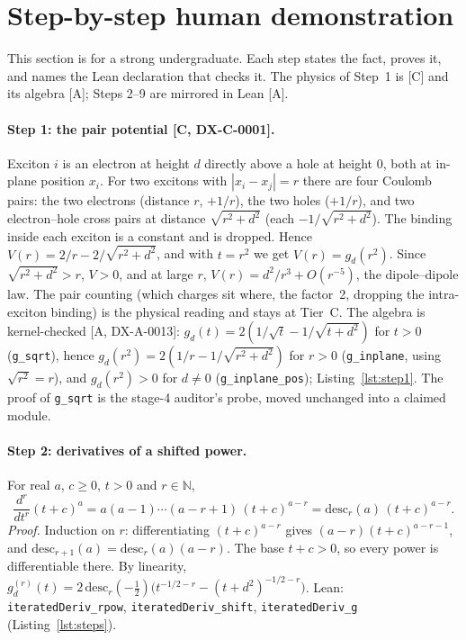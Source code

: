 \documentclass[11pt]{article}
\theoremstyle{remark}
\newcommand{\tier}[1]{\textsf{[#1]}}
\newcommand{\lean}[1]{\texttt{#1}}
\begin{document}


\section{Step-by-step human demonstration}\label{sec:human}
This section is for a strong undergraduate. Each step states the fact, proves it, and names the Lean declaration that
checks it. The physics of Step~1 is \tier{C} and its algebra \tier{A}; Steps 2--9 are mirrored in Lean \tier{A}.



\paragraph{Step 1: the pair potential \tier{C, DX-C-0001}.} Exciton $i$ is an electron at height $d$ directly above a hole
at height $0$, both at in-plane position $x_i$. For two excitons with $|x_i-x_j|=r$ there are four Coulomb pairs: the two
electrons (distance $r$, $+1/r$), the two holes ($+1/r$), and two electron--hole cross pairs at distance $\sqrt{r^2+d^2}$
(each $-1/\sqrt{r^2+d^2}$). The binding inside each exciton is a constant and is dropped. Hence
$V(r)=2/r-2/\sqrt{r^2+d^2}$, and with $t=r^2$ we get $V(r)=g_d(r^2)$. Since $\sqrt{r^2+d^2}>r$, $V>0$, and at large
$r$, $V(r)=d^2/r^3+O(r^{-5})$, the dipole--dipole law. The pair counting (which charges sit where, the factor~2,
dropping the intra-exciton binding) is the physical reading and stays at Tier~C. The algebra is kernel-checked
\tier{A, DX-A-0013}: $g_d(t)=2(1/\sqrt t-1/\sqrt{t+d^2})$ for $t>0$ (\lean{g\_sqrt}), hence
$g_d(r^2)=2(1/r-1/\sqrt{r^2+d^2})$ for $r>0$ (\lean{g\_inplane}, using $\sqrt{r^2}=r$), and $g_d(r^2)>0$ for $d\ne0$
(\lean{g\_inplane\_pos}); Listing~\ref{lst:step1}. The proof of \lean{g\_sqrt} is the stage-4 auditor's probe, moved
unchanged into a claimed module.

\paragraph{Step 2: derivatives of a shifted power.} For real $a$, $c\ge0$, $t>0$ and $r\in\mathbb N$,
\[\frac{d^r}{dt^r}(t+c)^a=a(a-1)\cdots(a-r+1)\,(t+c)^{a-r}=\mathrm{desc}_r(a)\,(t+c)^{a-r}.\]
\emph{Proof.} Induction on $r$: differentiating $(t+c)^{a-r}$ gives $(a-r)(t+c)^{a-r-1}$, and
$\mathrm{desc}_{r+1}(a)=\mathrm{desc}_r(a)(a-r)$. The base $t+c>0$, so every power is differentiable there. By linearity,
$g_d^{(r)}(t)=2\,\mathrm{desc}_r(-\tfrac12)\bigl(t^{-1/2-r}-(t+d^2)^{-1/2-r}\bigr)$.
Lean: \lean{iteratedDeriv\_rpow}, \lean{iteratedDeriv\_shift}, \lean{iteratedDeriv\_g} (Listing~\ref{lst:steps}).
\end{document}
